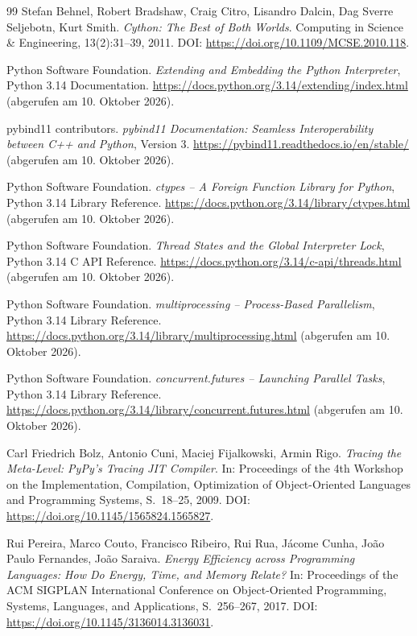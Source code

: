 \documentclass[a4paper,12pt, twoside]{report}
\theoremstyle{definition}
\begin{document}
\begin{thebibliography}{99}
Stefan Behnel, Robert Bradshaw, Craig Citro, Lisandro Dalcin, Dag Sverre Seljebotn, Kurt Smith.
\emph{Cython: The Best of Both Worlds}.
Computing in Science \& Engineering, 13(2):31--39, 2011.
DOI: \url{https://doi.org/10.1109/MCSE.2010.118}.

Python Software Foundation.
\emph{Extending and Embedding the Python Interpreter}, Python 3.14 Documentation.
\url{https://docs.python.org/3.14/extending/index.html} (abgerufen am 10. Oktober 2026).

pybind11 contributors.
\emph{pybind11 Documentation: Seamless Interoperability between C++ and Python}, Version 3.
\url{https://pybind11.readthedocs.io/en/stable/} (abgerufen am 10. Oktober 2026).

Python Software Foundation.
\emph{ctypes -- A Foreign Function Library for Python}, Python 3.14 Library Reference.
\url{https://docs.python.org/3.14/library/ctypes.html} (abgerufen am 10. Oktober 2026).

Python Software Foundation.
\emph{Thread States and the Global Interpreter Lock}, Python 3.14 C API Reference.
\url{https://docs.python.org/3.14/c-api/threads.html} (abgerufen am 10. Oktober 2026).

Python Software Foundation.
\emph{multiprocessing -- Process-Based Parallelism}, Python 3.14 Library Reference.
\url{https://docs.python.org/3.14/library/multiprocessing.html} (abgerufen am 10. Oktober 2026).

Python Software Foundation.
\emph{concurrent.futures -- Launching Parallel Tasks}, Python 3.14 Library Reference.
\url{https://docs.python.org/3.14/library/concurrent.futures.html} (abgerufen am 10. Oktober 2026).

Carl Friedrich Bolz, Antonio Cuni, Maciej Fijalkowski, Armin Rigo.
\emph{Tracing the Meta-Level: PyPy's Tracing JIT Compiler}.
In: Proceedings of the 4th Workshop on the Implementation, Compilation, Optimization of Object-Oriented Languages and Programming Systems, S.~18--25, 2009.
DOI: \url{https://doi.org/10.1145/1565824.1565827}.

Rui Pereira, Marco Couto, Francisco Ribeiro, Rui Rua, J\'acome Cunha, Jo\~ao Paulo Fernandes, Jo\~ao Saraiva.
\emph{Energy Efficiency across Programming Languages: How Do Energy, Time, and Memory Relate?}
In: Proceedings of the ACM SIGPLAN International Conference on Object-Oriented Programming, Systems, Languages, and Applications, S.~256--267, 2017.
DOI: \url{https://doi.org/10.1145/3136014.3136031}.


\end{thebibliography}
\end{document}
